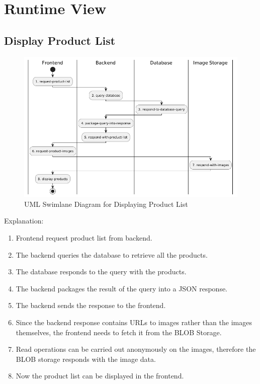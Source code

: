 \hypertarget{section-runtime-view}{%
\section{Runtime View}\label{section-runtime-view}}

\hypertarget{__runtime_scenario_1}{%
\subsection{Display Product List}\label{__runtime_scenario_1}}
\begin{figure}[h]
  \centering
  \includegraphics[width=\textwidth]{images/uml_swimlane_product_list.png}
  \caption{UML Swimlane Diagram for Displaying Product List}
\end{figure}

Explanation:
\begin{enumerate}
  \item Frontend request product list from backend.
  \item The backend queries the database to retrieve all the products.
  \item The database responds to the query with the products.
  \item The backend packages the result of the query into a JSON response.
  \item The backend sends the response to the frontend.
  \item Since the backend response contains URLs to images rather than the images themselves, the frontend needs to fetch it from the BLOB Storage.
  \item Read operations can be carried out anonymously on the images, therefore the BLOB storage responds with the image data.
  \item Now the product list can be displayed in the frontend.
\end{enumerate}

